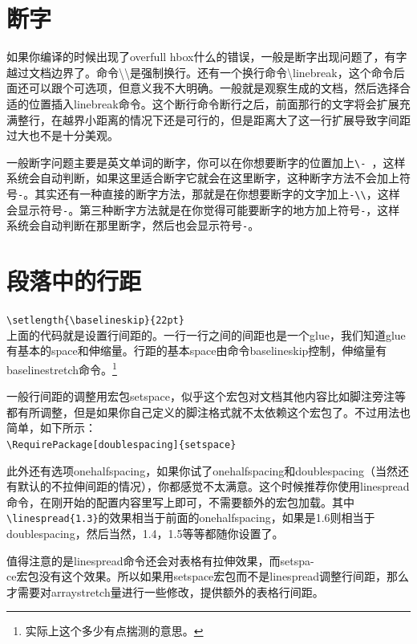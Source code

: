 \documentclass[11pt,oneside]{book}
\begin{document}
\section{断字}
如果你编译的时候出现了overfull hbox什么的错误，一般是断字出现问题了，有字越过文档边界了。命令\textbackslash \textbackslash 是强制换行。还有一个换行命令\textbackslash linebreak，这个命令后面还可以跟个可选项，但意义我不大明确。一般就是观察生成的文档，然后选择合适的位置插入linebreak命令。这个断行命令断行之后，前面那行的文字将会扩展充满整行，在越界小距离的情况下还是可行的，但是距离大了这一行扩展导致字间距过大也不是十分美观。

一般断字问题主要是英文单词的断字，你可以在你想要断字的位置加上\verb+\- +，这样系统会自动判断，如果这里适合断字它就会在这里断字，这种断字方法不会加上符号\verb+-+。其实还有一种直接的断字方法，那就是在你想要断字的文字加上\verb+-\\+，这样会显示符号\verb+-+。第三种断字方法就是在你觉得可能要断字的地方加上符号\verb+-+，这样系统会自动判断在那里断字，然后也会显示符号\verb+-+。



\section[段落中的行距]{段落中的行距}
\verb+\setlength{\baselineskip}{22pt}+\\
上面的代码就是设置行间距的。一行一行之间的间距也是一个glue，我们知道glue有基本的space和伸缩量。行距的基本space由命令baselineskip控制，伸缩量有baselinestretch命令。\footnote{实际上这个多少有点揣测的意思。}

一般行间距的调整用宏包setspace，似乎这个宏包对文档其他内容比如脚注旁注等都有所调整，但是如果你自己定义的脚注格式就不太依赖这个宏包了。不过用法也简单，如下所示：\\
\verb+\RequirePackage[doublespacing]{setspace}+

此外还有选项onehalfspacing，如果你试了onehalfspacing和doublespacing（当然还有默认的不拉伸间距的情况），你都感觉不太满意。这个时候推荐你使用linespread命令，在刚开始的配置内容里写上即可，不需要额外的宏包加载。其中\verb+\linespread{1.3}+的效果相当于前面的onehalfspacing，如果是1.6则相当于doublespacing，然后当然，1.4，1.5等等都随你设置了。

\label{sec:段落中的行距}
值得注意的是linespread命令还会对表格有拉伸效果，而setspa-\\ce宏包没有这个效果。所以如果用setspace宏包而不是linespread调整行间距，那么才需要对arraystretch量进行一些修改，提供额外的表格行间距。
\end{document}
